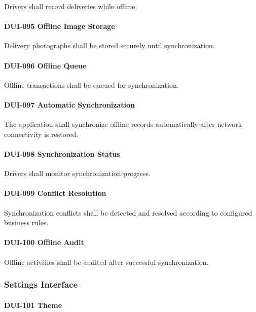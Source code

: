 Drivers shall record deliveries while offline.

\paragraph{DUI-095 Offline Image Storage}

Delivery photographs shall be stored securely until synchronization.

\paragraph{DUI-096 Offline Queue}

Offline transactions shall be queued for synchronization.

\paragraph{DUI-097 Automatic Synchronization}

The application shall synchronize offline records automatically after
network connectivity is restored.

\paragraph{DUI-098 Synchronization Status}

Drivers shall monitor synchronization progress.

\paragraph{DUI-099 Conflict Resolution}

Synchronization conflicts shall be detected and resolved according to
configured business rules.

\paragraph{DUI-100 Offline Audit}

Offline activities shall be audited after successful synchronization.


\subsubsection*{Settings Interface}

\paragraph{DUI-101 Theme}

